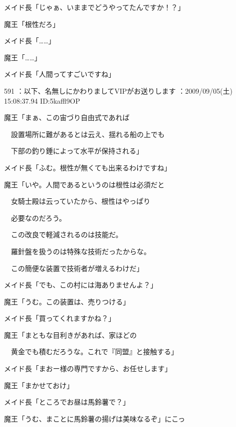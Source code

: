 \documentclass[a4j,twocolumn]{tarticle}
\begin{document}
メイド長「じゃぁ、いままでどうやってたんですか！？」 



魔王「根性だろ」 



メイド長「……」\par{} 
魔王「……」 



メイド長「人間ってすごいですね」 

	

	

591 ：以下、名無しにかわりましてVIPがお送りします ：2009/09/05(土) 15:08:37.94 ID:5kaffl9OP 


魔王「まぁ、この宙づり自由式であれば\par{} 
　設置場所に難があるとは云え、揺れる船の上でも\par{} 
　下部の釣り錘によって水平が保持される」 



メイド長「ふむ。根性が無くても出来るわけですね」 



魔王「いや。人間であるというのは根性は必須だと\par{} 
　女騎士殿は云っていたから、根性はやっぱり\par{} 
　必要なのだろう。\par{} 
　この改良で軽減されるのは技能だ。\par{}
　羅針盤を扱うのは特殊な技術だったからな。\par{} 
　この簡便な装置で技術者が増えるわけだ」 



メイド長「でも、この村には海ありませんよ？」\par{} 
魔王「うむ。この装置は、売りつける」 



メイド長「買ってくれますかね？」\par{} 
魔王「まともな目利きがあれば、家ほどの\par{} 
　黄金でも積むだろうな。これで『同盟』と接触する」 



メイド長「まおー様の専門ですから、お任せします」\par{} 
魔王「まかせておけ」 



メイド長「ところでお昼は馬鈴薯で？」\par{} 
魔王「うむ、まことに馬鈴薯の揚げは美味なるぞ」にこっ 

	
    
\end{document}

